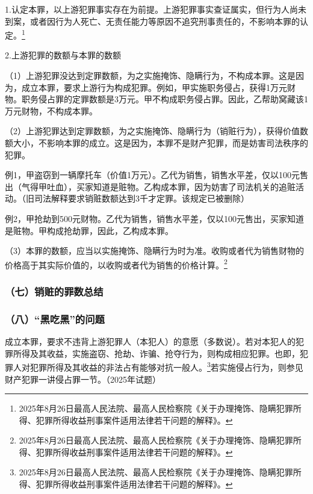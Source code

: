 1.认定本罪，以上游犯罪事实存在为前提。上游犯罪事实查证属实，但行为人尚未到案，或者因行为人死亡、无责任能力等原因不追究刑事责任的，不影响本罪的认定。\footnote{2025年8月26日最高人民法院、最高人民检察院《关于办理掩饰、隐瞒犯罪所得、犯罪所得收益刑事案件适用法律若干问题的解释》。}

2.上游犯罪的数额与本罪的数额

（1）上游犯罪没达到定罪数额，为之实施掩饰、隐瞒行为，不构成本罪。这是因为，成立本罪，要求上游行为构成犯罪。例如，甲实施职务侵占，获得1万元财物。职务侵占罪的定罪数额是3万元。甲不构成职务侵占罪。因此，乙帮助窝藏该1万元财物，不构成本罪。

（2）上游犯罪达到定罪数额，为之实施掩饰、隐瞒行为（销赃行为），获得价值数额大小，不影响本罪的成立。这是因为，本罪不是财产犯罪，而是妨害司法秩序的犯罪。

例1，甲盗窃到一辆摩托车（价值1万元）。乙代为销售，销售水平差，仅以100元售出（气得甲吐血），买家知道是赃物。乙构成本罪，因为妨害了司法机关的追赃活动。（旧司法解释要求销赃数额达到3千才定罪。该规定已被删除）

例2，甲抢劫到500元财物。乙代为销售，销售水平差，仅以100元售出，买家知道是赃物。甲构成抢劫罪，因此，乙构成本罪。

（3）本罪的数额，应当以实施掩饰、隐瞒行为时为准。收购或者代为销售财物的价格高于其实际价值的，以收购或者代为销售的价格计算。\footnote{2025年8月26日最高人民法院、最高人民检察院《关于办理掩饰、隐瞒犯罪所得、犯罪所得收益刑事案件适用法律若干问题的解释》。}

\subsubsection*{（七）销赃的罪数总结}


\subsubsection*{（八）“黑吃黑”的问题}

成立本罪，要求不违背上游犯罪人（本犯人）的意愿（多数说）。若对本犯人的犯罪所得及其收益，实施盗窃、抢劫、诈骗、抢夺行为，则构成相应犯罪。也即，犯罪人对犯罪所得及其收益的非法占有能够对抗一般人。\footnote{2025年8月26日最高人民法院、最高人民检察院《关于办理掩饰、隐瞒犯罪所得、犯罪所得收益刑事案件适用法律若干问题的解释》。}若实施侵占行为，则参见财产犯罪一讲侵占罪一节。（2025年试题）

